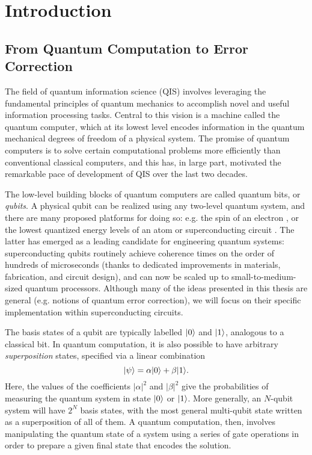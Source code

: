 \chapter{Introduction\label{ch:1_Introduction}}

\section{From Quantum Computation to Error Correction}

The field of quantum information science (QIS) involves leveraging the fundamental principles of quantum mechanics to accomplish novel and useful information processing tasks. Central to this vision is a machine called the quantum computer, which at its lowest level encodes information in the quantum mechanical degrees of freedom of a physical system. The promise of quantum computers is to solve certain computational problems more efficiently than conventional classical computers, and this has, in large part, motivated the remarkable pace of development of QIS over the last two decades. 

The low-level building blocks of quantum computers are called quantum bits, or \textit{qubits}. A physical qubit can be realized using any two-level quantum system, and there are many proposed platforms for doing so: e.g. the spin of an electron \cite{burkard2023semiconductor}, or the lowest quantized energy levels of an atom \cite{briegel2000quantum} or superconducting circuit \cite{devoret2013superconducting, krantz2019quantum, kjaergaard2020superconducting}. The latter has emerged as a leading candidate for engineering quantum systems: superconducting qubits routinely achieve coherence times on the order of hundreds of microseconds \cite{kjaergaard2020superconducting} (thanks to dedicated improvements in materials, fabrication, and circuit design), and can now be scaled up to small-to-medium-sized quantum processors. Although many of the ideas presented in this thesis are general (e.g. notions of quantum error correction), we will focus on their specific implementation within superconducting circuits. 

The basis states of a qubit are typically labelled $\lvert0\rangle$ and $\lvert1\rangle$, analogous to a classical bit. In quantum computation, it is also possible to have arbitrary \textit{superposition} states, specified via a linear combination
\begin{equation}
    \lvert\psi\rangle = \alpha\lvert0\rangle + \beta\lvert1\rangle.
\end{equation}
Here, the values of the coefficients $|\alpha|^2$ and $|\beta|^2$ give the probabilities of measuring the quantum system in state $\lvert0\rangle$ or $\lvert1\rangle$. More generally, an $N$-qubit system will have $2^N$ basis states, with the most general multi-qubit state written as a superposition of all of them. A quantum computation, then, involves manipulating the quantum state of a system using a series of gate operations in order to prepare a given final state that encodes the solution. 


